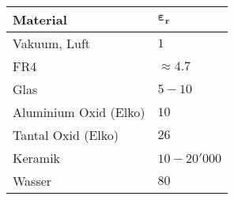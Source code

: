 \begin{center}
    \begin{tabular}{l | l }
        \textbf{Material}       &  $\bm{\varepsilon_r}$ \\
        \midrule
        Vakuum, Luft            & $1$                   \\
        FR4                     & $\approx 4.7$         \\
        Glas                    & $5-10$                \\
        Aluminium Oxid (Elko)   & $10$                  \\
        Tantal Oxid (Elko)      & $26$                  \\
        Keramik                 & $10 - 20'000$         \\
        Wasser                  & $80$  
    \end{tabular}
\end{center}